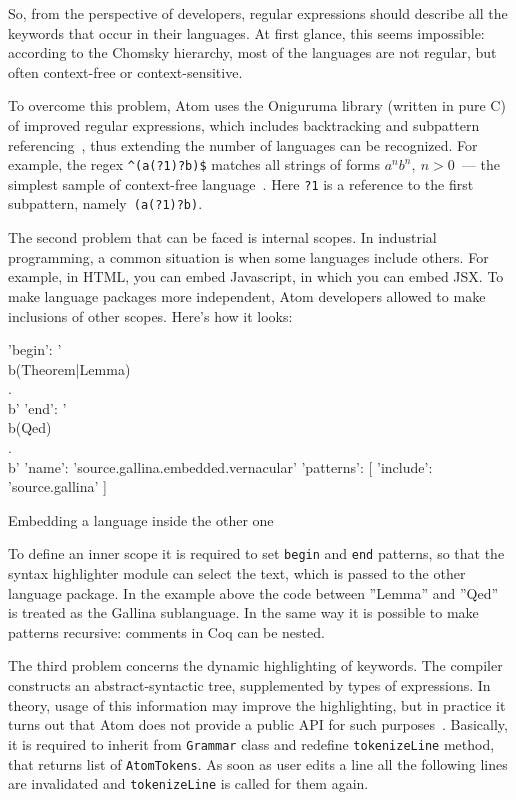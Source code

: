 So, from the perspective of developers, regular expressions should describe all the keywords that occur in their languages. At first glance, this seems impossible: according to the Chomsky hierarchy, most of the languages are not regular, but often context-free or context-sensitive.

To overcome this problem, Atom uses the Oniguruma library (written in pure C) of improved regular expressions, which includes backtracking and subpattern referencing~\autocite{oniguruma}, thus extending the number of languages can be recognized. For example, the regex \texttt{\textasciicircum(a(?1)?b)\$} matches all strings of forms $a^n b^n,\ n > 0$~--- the simplest sample of context-free language~\autocite{aho}. Here \texttt{?1} is a reference to the first subpattern, namely~\texttt{(a(?1)?b)}. 

The second problem that can be faced is internal scopes. In industrial programming, a common situation is when some languages include others. For example, in HTML, you can embed Javascript, in which you can embed JSX. To make language packages more independent, Atom developers allowed to make inclusions of other scopes. Here's how it looks:

\begin{ListingEnv}[H]
\begin{Verb}

    'begin':    '\\b(Theorem|Lemma)\\.\\b'
    'end':      '\\b(Qed)\\.\\b'
    'name':     'source.gallina.embedded.vernacular'
    'patterns': [{ 'include': 'source.gallina' }]
\end{Verb}
\caption{Embedding a language inside the other one}
\label{list:embedding}
\end{ListingEnv}

To define an inner scope it is required to set \texttt{begin} and \texttt{end} patterns, so that the syntax highlighter module can select the text, which is passed to the other language package. In the example above the code between ''Lemma'' and ''Qed'' is treated as the Gallina sublanguage. In the same way it is possible to make patterns recursive: comments in Coq can be nested.

The third problem concerns the dynamic highlighting of keywords. The compiler constructs an abstract-syntactic tree, supplemented by types of expressions. In theory, usage of this information may improve the highlighting, but in practice it turns out that Atom does not provide a public API for such purposes~\autocite{atom-grammar}. Basically, it is required to inherit from \texttt{Grammar} class and redefine \texttt{tokenizeLine} method, that returns list of \texttt{AtomTokens}. As soon as user edits a line all the following lines are invalidated and \texttt{tokenizeLine} is called for them again.

